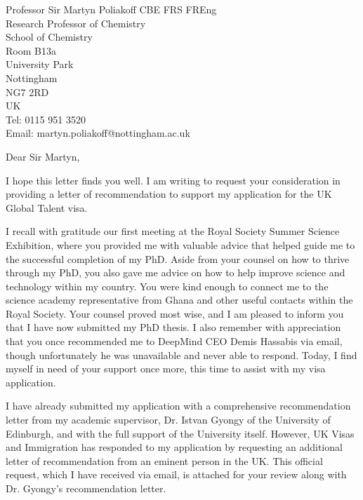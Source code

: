 \documentclass[12pt,a4paper]{letter}
\begin{document}
\begin{letter}{Professor Sir Martyn Poliakoff CBE FRS FREng\\Research Professor of Chemistry\\School of Chemistry\\Room B13a\\University Park\\Nottingham\\NG7 2RD\\UK\\Tel: 0115 951 3520\\Email: martyn.poliakoff@nottingham.ac.uk}

\date{\today}

\opening{Dear Sir Martyn,}

I hope this letter finds you well. I am writing to request your consideration in providing a letter of recommendation to support my application for the UK Global Talent visa.

I recall with gratitude our first meeting at the Royal Society Summer Science Exhibition, where you provided me with valuable advice that helped guide me to the successful completion of my PhD. Aside from your counsel on how to thrive through my PhD, you also gave me advice on how to help improve science and technology within my country. You were kind enough to connect me to the science academy representative from Ghana and other useful contacts within the Royal Society. Your counsel proved most wise, and I am pleased to inform you that I have now submitted my PhD thesis. I also remember with appreciation that you once recommended me to DeepMind CEO Demis Hassabis via email, though unfortunately he was unavailable and never able to respond. Today, I find myself in need of your support once more, this time to assist with my visa application.

I have already submitted my application with a comprehensive recommendation letter from my academic supervisor, Dr. Istvan Gyongy of the University of Edinburgh, and with the full support of the University itself. However, UK Visas and Immigration has responded to my application by requesting an additional letter of recommendation from an eminent person in the UK. This official request, which I have received via email, is attached for your review along with Dr. Gyongy's recommendation letter.


\end{letter}
\end{document}

